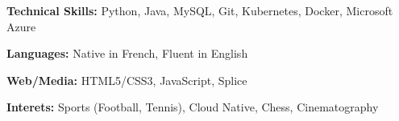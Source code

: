 

\begin{cvparagraph}

\textbf{Technical Skills:} Python, Java, MySQL, Git, Kubernetes, Docker, Microsoft Azure \hfill

\textbf{Languages:} Native in French, Fluent in English \hfill 

\textbf{Web/Media:} HTML5/CSS3, JavaScript, Splice \hfill 

\textbf{Interets:} Sports (Football, Tennis), Cloud Native, Chess, Cinematography \hfill 
\end{cvparagraph}



